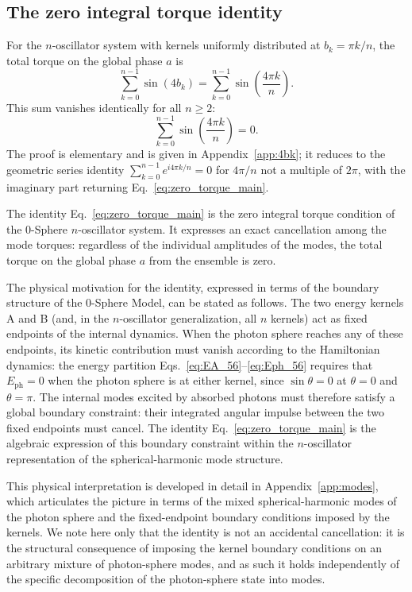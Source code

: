 \documentclass[%
 reprint, amsmath,amssymb, aps, prb, ]{revtex4-2}
\numberwithin{equation}{section}
\newcommand{\EphS}{E_{\text{ph}}}
\begin{document}
\subsection{The zero integral torque identity}
\label{sec:zerotorque_identity}

For the $n$-oscillator system with kernels uniformly distributed at $b_k = \pi k/n$, the total torque on the global phase $a$ is
\begin{equation}
\sum_{k=0}^{n-1}\sin(4b_k) = \sum_{k=0}^{n-1}\sin\!\left(\frac{4\pi k}{n}\right).
\label{eq:zero_torque_sum}
\end{equation}
This sum vanishes identically for all $n \geq 2$:
\begin{equation}
\sum_{k=0}^{n-1}\sin\!\left(\frac{4\pi k}{n}\right) = 0.
\label{eq:zero_torque_main}
\end{equation}
The proof is elementary and is given in Appendix~\ref{app:4bk}; it reduces to the geometric series identity $\sum_{k=0}^{n-1} e^{i 4\pi k/n} = 0$ for $4\pi/n$ not a multiple of $2\pi$, with the imaginary part returning Eq.~\eqref{eq:zero_torque_main}.

The identity Eq.~\eqref{eq:zero_torque_main} is the zero integral torque condition of the 0-Sphere $n$-oscillator system. It expresses an exact cancellation among the mode torques: regardless of the individual amplitudes of the modes, the total torque on the global phase $a$ from the ensemble is zero.

The physical motivation for the identity, expressed in terms of the boundary structure of the 0-Sphere Model, can be stated as follows. The two energy kernels A and B (and, in the $n$-oscillator generalization, all $n$ kernels) act as fixed endpoints of the internal dynamics. When the photon sphere reaches any of these endpoints, its kinetic contribution must vanish according to the Hamiltonian dynamics: the energy partition Eqs.~\eqref{eq:EA_56}--\eqref{eq:Eph_56} requires that $\EphS = 0$ when the photon sphere is at either kernel, since $\sin\theta = 0$ at $\theta = 0$ and $\theta = \pi$. The internal modes excited by absorbed photons must therefore satisfy a global boundary constraint: their integrated angular impulse between the two fixed endpoints must cancel. The identity Eq.~\eqref{eq:zero_torque_main} is the algebraic expression of this boundary constraint within the $n$-oscillator representation of the spherical-harmonic mode structure.

This physical interpretation is developed in detail in Appendix~\ref{app:modes}, which articulates the picture in terms of the mixed spherical-harmonic modes of the photon sphere and the fixed-endpoint boundary conditions imposed by the kernels. We note here only that the identity is not an accidental cancellation: it is the structural consequence of imposing the kernel boundary conditions on an arbitrary mixture of photon-sphere modes, and as such it holds independently of the specific decomposition of the photon-sphere state into modes.
\end{document}
